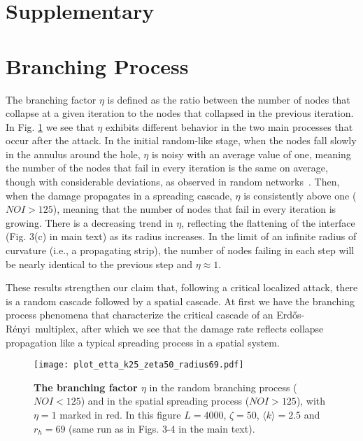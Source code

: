 \documentclass[twocolumn,noshowpacs,pre,preprintnumbers,superscriptaddress,amsmath,amssymb,floatfix]{revtex4}
\newcommand{\kk}{\langle k \rangle}
\newcommand{\er}{Erd\H{o}s-R\'{e}nyi}
\begin{document}
	
	
	
	\newpage
	\widetext
	\section*{Supplementary}
	\appendix
	\section{Branching Process}
	
	The branching factor $\eta$ is defined as the ratio between the number of nodes that collapse at a given iteration to the nodes that collapsed in the previous iteration. 
	In Fig. \ref{fig: etta2} we see that $\eta$ exhibits different behavior in the two main processes that occur after the attack.
	In the initial random-like stage, when the nodes fall slowly in the annulus around the hole, $\eta$ is noisy with an average value of one, meaning the number of the nodes that fail in every iteration is the same on average, though with considerable deviations, as observed in random networks~\cite{dong-pre2014}. 
	Then, when the damage propagates in a spreading cascade, $\eta$ is consistently above one ($NOI > 125$), meaning that the number of nodes that fail in every iteration is growing. There is a decreasing trend in $\eta$, reflecting the flattening of the interface (Fig. 3(c) in main text) as its radius increases. In the limit of an infinite radius of curvature (i.e., a propagating strip), the number of nodes failing in each step will be nearly identical to the previous step and $\eta \approx 1$.
	
	These results strengthen our claim that, following a critical localized attack, there is a random cascade followed by a spatial cascade.
	At first we have the branching process phenomena that characterize the critical cascade of an \er~multiplex, after which we see that the damage rate reflects collapse propagation like a typical spreading process in a spatial system.
	
	\begin{figure}
		\texttt{[image: plot\_etta\_k25\_zeta50\_radius69.pdf]}
		\caption{\textbf{The branching factor $\eta$}
			in the random branching process ($NOI<125$) and in the spatial spreading process ($NOI>125$), with $\eta = 1$ marked in red.
			In this figure $L = 4000$, $\zeta = 50$, $\kk = 2.5$ and $r_h = 69$ (same run as in Figs. 3-4 in the main text).}
		\label{fig: etta2}
		
	\end{figure}
\end{document}
